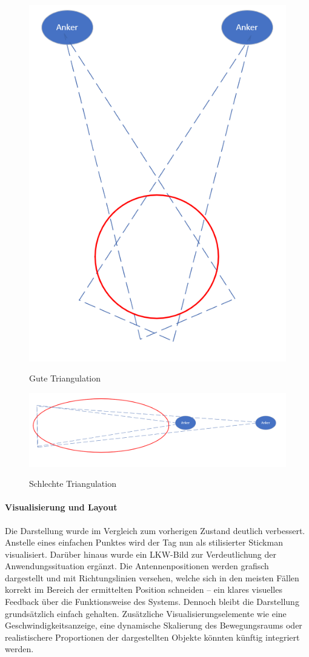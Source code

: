 \documentclass[a4paper, 12pt]{article} %
\begin{document}
\begin{figure}[H]
    \includegraphics[width=0.5\linewidth]{images/Gute Triangulation.png}\\[1ex]
    \centering
    \caption{Gute Triangulation}
    \label{ABBILDUNG}
\end{figure}
\begin{figure}[H]
    \includegraphics[width=1\linewidth]{images/Schlechte Triangulation.png}\\[1ex]
    \centering
    \caption{Schlechte Triangulation}
    \label{ABBILDUNG}
\end{figure}

\paragraph{Visualisierung und Layout}
Die Darstellung wurde im Vergleich zum vorherigen Zustand deutlich verbessert. Anstelle eines einfachen Punktes wird der Tag nun als stilisierter 
Stickman visualisiert. Darüber hinaus wurde ein \ac{LKW}-Bild zur Verdeutlichung der Anwendungssituation ergänzt. Die Antennenpositionen werden 
grafisch dargestellt und mit Richtungslinien versehen, welche sich in den meisten Fällen korrekt im Bereich der ermittelten Position schneiden – ein 
klares visuelles Feedback über die Funktionsweise des Systems. Dennoch bleibt die Darstellung grundsätzlich einfach gehalten. Zusätzliche 
Visualisierungselemente wie eine Geschwindigkeitsanzeige, eine dynamische Skalierung des Bewegungsraums oder realistischere Proportionen der 
dargestellten Objekte könnten künftig integriert werden.
\end{document}
